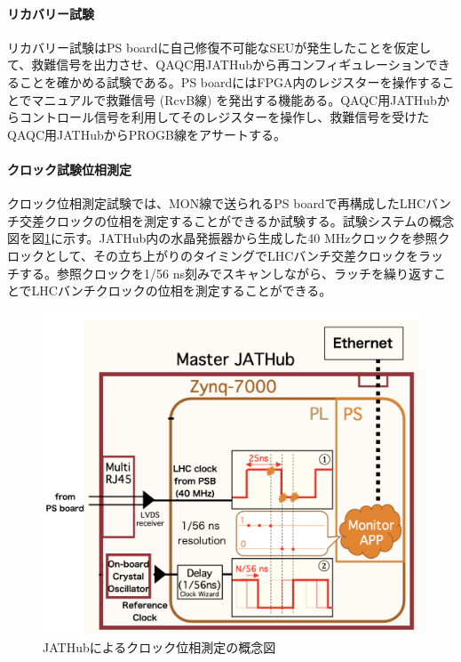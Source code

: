 \paragraph{リカバリー試験}\par
リカバリー試験はPS boardに自己修復不可能なSEUが発生したことを仮定して、救難信号を出力させ、QAQC用JATHubから再コンフィギュレーションできることを確かめる試験である。PS boardにはFPGA内のレジスターを操作することでマニュアルで救難信号 (RcvB線) を発出する機能ある。QAQC用JATHubからコントロール信号を利用してそのレジスターを操作し、救難信号を受けたQAQC用JATHubからPROGB線をアサートする。
\baselineskip

\paragraph{クロック試験位相測定}\par
クロック位相測定試験では、MON線で送られるPS boardで再構成したLHCバンチ交差クロックの位相を測定することができるか試験する。試験システムの概念図を図\ref{JATHubclockmeasure}\cite{mt_atanaka}に示す。JATHub内の水晶発振器から生成した40 MHzクロックを参照クロックとして、その立ち上がりのタイミングでLHCバンチ交差クロックをラッチする。参照クロックを1/56 ns刻みでスキャンしながら、ラッチを繰り返すことでLHCバンチクロックの位相を測定することができる。
\baselineskip

\begin{figure} 
    \centering
    \includegraphics[width=16cm]{fig/QAQC/JATHubclockmasurement.png}
    \caption[JATHubによるクロック位相測定の概念図]{JATHubによるクロック位相測定の概念図\cite{mt_atanaka}}
    \label{JATHubclockmeasure}
\end{figure}    

